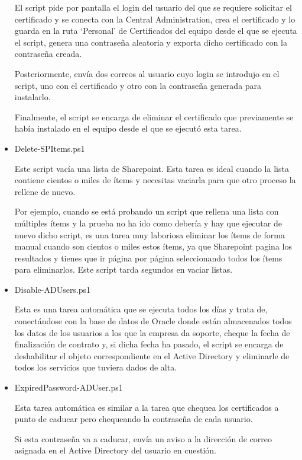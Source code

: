 \documentclass[a4paper, 12pt]{book}
\begin{document}
\begin{itemize}
El script pide por pantalla el login del usuario del que se requiere solicitar el certificado y se conecta con la Central Administration, crea el certificado y lo guarda en la ruta ‘Personal’ de Certificados del equipo desde el que se ejecuta el script, genera una contraseña aleatoria y exporta dicho certificado con la contraseña creada. 

Posteriormente, envía dos correos al usuario cuyo login se introdujo en el script, uno con el certificado y otro con la contraseña generada para instalarlo. 

Finalmente, el script se encarga de eliminar el certificado que previamente se había instalado en el equipo desde el que se ejecutó esta tarea.
\\

\item Delete-SPItems.ps1

Este script vacía una lista de Sharepoint. Esta tarea es ideal cuando la lista contiene cientos o miles de ítems y necesitas vaciarla para que otro proceso la rellene de nuevo. 

Por ejemplo, cuando se está probando un script que rellena una lista con múltiples ítems y la prueba no ha ido como debería y hay que ejecutar de nuevo dicho script, es una tarea muy laboriosa eliminar los ítems de forma manual cuando son cientos o miles estos ítems, ya que Sharepoint pagina los resultados y tienes que ir página por página seleccionando todos los ítems para eliminarlos. Este script tarda segundos en vaciar listas.
\\

\item Disable-ADUsers.ps1

Esta es una tarea automática que se ejecuta todos los días y trata de, conectándose con la base de datos de Oracle donde están almacenados todos los datos de los usuarios a los que la empresa da soporte, cheque la fecha de finalización de contrato y, si dicha fecha ha pasado, el script se encarga de deshabilitar el objeto correspondiente en el Active Directory y eliminarle de todos los servicios que tuviera dados de alta.
\\

\item ExpiredPassword-ADUser.ps1

Esta tarea automática es similar a la tarea que chequea los certificados a punto de caducar pero chequeando la contraseña de cada usuario.

Si esta contraseña va a caducar, envía un aviso a la dirección de correo asignada en el Active Directory del usuario en cuestión.
\\


\end{itemize}
\end{document}
